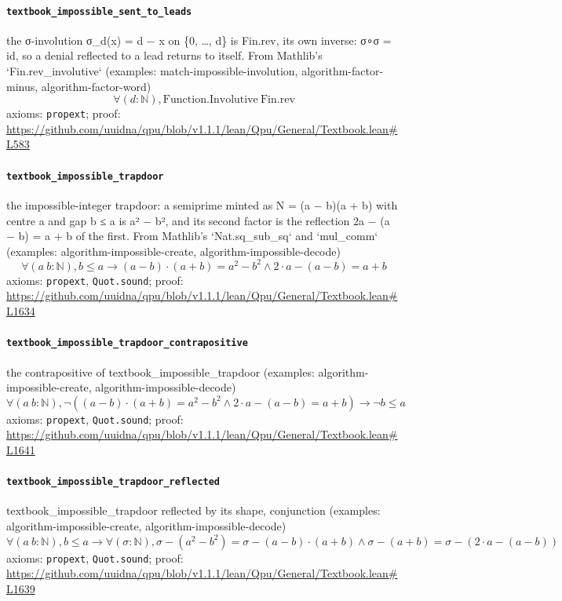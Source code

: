 \documentclass[11pt]{article}
\begin{document}
\paragraph{\texttt{textbook\_impossible\_sent\_to\_leads}}
the σ-involution σ\_d(x) = d − x on \{0, …, d\} is Fin.rev, its own inverse: σ∘σ = id, so a denial reflected to a lead returns to itself. From Mathlib's `Fin.rev\_involutive` (examples: match-impossible-involution, algorithm-factor-minus, algorithm-factor-word)
\[ \forall (d : \mathbb{N}), \mathrm{Function.Involutive}\ \mathrm{Fin.rev} \]
\noindent axioms: \texttt{propext}; proof: \url{https://github.com/uuidna/qpu/blob/v1.1.1/lean/Qpu/General/Textbook.lean\#L583}

\paragraph{\texttt{textbook\_impossible\_trapdoor}}
the impossible-integer trapdoor: a semiprime minted as N = (a − b)(a + b) with centre a and gap b ≤ a is a² − b², and its second factor is the reflection 2a − (a − b) = a + b of the first. From Mathlib's `Nat.sq\_sub\_sq` and `mul\_comm` (examples: algorithm-impossible-create, algorithm-impossible-decode)
\[ \forall (a\ b : \mathbb{N}), b \le a \to (a - b) \cdot (a + b) = a ^{2} - b ^{2} \land 2 \cdot a - (a - b) = a + b \]
\noindent axioms: \texttt{propext}, \texttt{Quot.sound}; proof: \url{https://github.com/uuidna/qpu/blob/v1.1.1/lean/Qpu/General/Textbook.lean\#L1634}

\paragraph{\texttt{textbook\_impossible\_trapdoor\_contrapositive}}
the contrapositive of textbook\_impossible\_trapdoor (examples: algorithm-impossible-create, algorithm-impossible-decode)
\[ \forall (a\ b : \mathbb{N}), \neg ((a - b) \cdot (a + b) = a ^{2} - b ^{2} \land 2 \cdot a - (a - b) = a + b) \to \neg b \le a \]
\noindent axioms: \texttt{propext}, \texttt{Quot.sound}; proof: \url{https://github.com/uuidna/qpu/blob/v1.1.1/lean/Qpu/General/Textbook.lean\#L1641}

\paragraph{\texttt{textbook\_impossible\_trapdoor\_reflected}}
textbook\_impossible\_trapdoor reflected by its shape, conjunction (examples: algorithm-impossible-create, algorithm-impossible-decode)
\[ \forall (a\ b : \mathbb{N}), b \le a \to \forall (\sigma : \mathbb{N}), \sigma - (a ^{2} - b ^{2}) = \sigma - (a - b) \cdot (a + b) \land \sigma - (a + b) = \sigma - (2 \cdot a - (a - b)) \]
\noindent axioms: \texttt{propext}, \texttt{Quot.sound}; proof: \url{https://github.com/uuidna/qpu/blob/v1.1.1/lean/Qpu/General/Textbook.lean\#L1639}
\end{document}

